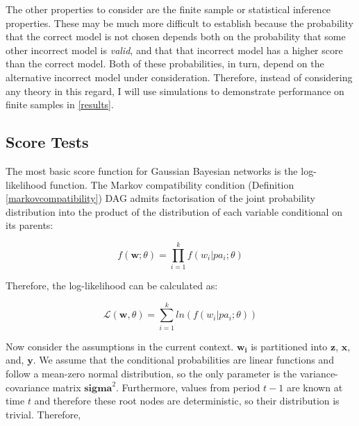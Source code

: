 \documentclass{article}
\begin{document}
The other properties to consider are the finite sample or statistical inference properties. These may be much more difficult to establish because the probability that the correct model is not chosen depends both on the probability that some other incorrect model is \textit{valid}, and that that incorrect model has a higher score than the correct model. Both of these probabilities, in turn, depend on the alternative incorrect model under consideration. Therefore, instead of considering any theory in this regard, I will use simulations to demonstrate performance on finite samples in \ref{results}.

\subsection{Score Tests} \label{scoretests}

The most basic score function for Gaussian Bayesian networks is the log-likelihood function. The Markov compatibility condition (Definition \ref{markovcompatibility}) DAG admits factorisation of the joint probability distribution into the product of the distribution of each variable conditional on its parents:

\begin{equation}
  f(\mathbf{w};\theta) = \prod_{i=1}^{k} f(w_i | pa_i;\theta)
\end{equation}

Therefore, the log-likelihood can be calculated as:

\begin{equation}
  \mathcal{L}(\mathbf{w},\theta) = \sum_{i=1}^{k} ln(f(w_i | pa_i;\theta))
\end{equation}

Now consider the assumptions in the current context. $\mathbf{w_i}$ is partitioned into $\mathbf{z}$, $\mathbf{x}$, and, $\mathbf{y}$. We assume that the conditional probabilities are linear functions and follow a mean-zero normal distribution, so the only parameter is the variance-covariance matrix $\mathbf{sigma}^2$. Furthermore, values from period $t-1$ are known at time $t$ and therefore these root nodes are deterministic, so their distribution is trivial. Therefore,
\end{document}
